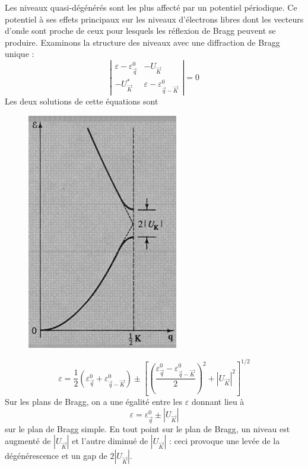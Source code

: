 	Les niveaux quasi-dégénérés sont les plus affecté par un potentiel périodique. 
	Ce potentiel à ses effets principaux sur les niveaux d'électrons libres dont les 
	vecteurs d'onde sont proche de ceux pour lesquels les réflexion de Bragg peuvent 
	se produire. Examinons la structure des niveaux avec une diffraction de Bragg 
	unique :
	\begin{equation}
	\left|\begin{array}{cc}
	\varepsilon-\varepsilon_{\vec{q}}^0 & -U_{\vec{K}}\\
	-U_{\vec{K}}^* & \varepsilon - \varepsilon_{\vec{q}-\vec{K}}^0
	\end{array}\right| = 0
	\end{equation}
	Les deux solutions de cette équations sont \\
	\begin{figure}
	\vspace{-1.5cm}
	\includegraphics[scale=0.4]{ch5/image2.png}
	\end{figure}
	\vspace{-1cm}
	\begin{equation}
	\varepsilon = \frac{1}{2}\left(\varepsilon_{\vec{q}}^0+\varepsilon_{\vec{q}-
	\vec{K}}^0\right) \pm \left[\left(\dfrac{\varepsilon_{\vec{q}}^0 - \varepsilon_{
	 \vec{q}-\vec{K}}^0}{2}\right)^2 + |U_{\vec{K}}|^2\right]^{1/2}
	\end{equation}
	Sur les plans de Bragg, on a une égalité entre les $\varepsilon$ donnant lieu à
	\begin{equation}
	\varepsilon = \varepsilon_{\vec{q}}^0 \pm |U_{\vec{K}}|
	\end{equation}
	sur le plan de Bragg simple. En tout point sur le plan de Bragg, un niveau est 
	augmenté de $|U_{\vec{K}}|$ et l'autre diminué de $|U_{\vec{K}}|$ : ceci provoque 
	une levée de la dégénérescence et un gap de $2|U_{\vec{K}}|$.
	
